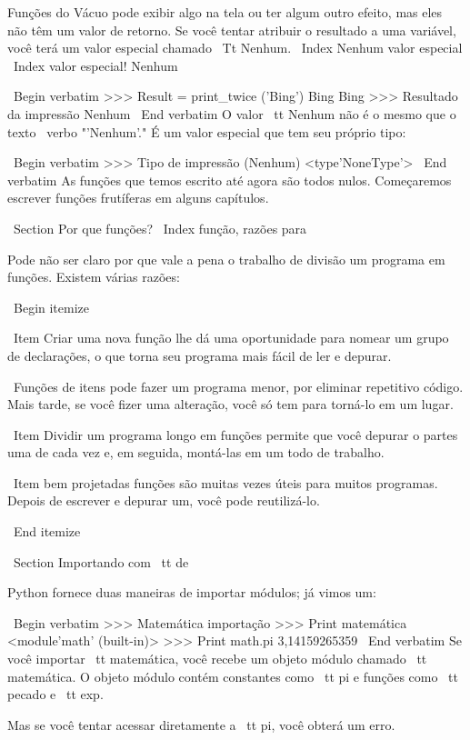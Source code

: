 \documentclass[10pt]{book}
\begin{document}
{Funções do Vácuo pode exibir algo na tela ou ter algum
outro efeito, mas eles não têm um valor de retorno. Se você tentar
atribuir o resultado a uma variável, você terá um valor especial chamado
{\ Tt Nenhum}.
\ Index {Nenhum valor especial}
\ Index {valor especial! Nenhum}

\ Begin {verbatim}
>>> Result = print_twice ('Bing')
Bing
Bing
>>> Resultado da impressão
Nenhum
\ End {verbatim}
%
O valor {\ tt Nenhum} não é o mesmo que o texto \ verbo "'Nenhum'." 
É um valor especial que tem seu próprio tipo:

\ Begin {verbatim}
>>> Tipo de impressão (Nenhum)
<type'NoneType'>
\ End {verbatim}
%
As funções que temos escrito até agora são todos nulos. Começaremos
escrever funções frutíferas em alguns capítulos.


\ Section {Por que funções?}
\ Index {função, razões para}

Pode não ser claro por que vale a pena o trabalho de divisão
um programa em funções. Existem várias razões:

\ Begin {itemize}

\ Item Criar uma nova função lhe dá uma oportunidade para nomear um grupo
de declarações, o que torna seu programa mais fácil de ler e depurar.

\ Funções de itens pode fazer um programa menor, por eliminar repetitivo
código. Mais tarde, se você fizer uma alteração, você só tem
para torná-lo em um lugar.

\ Item Dividir um programa longo em funções permite que você depurar o
partes uma de cada vez e, em seguida, montá-las em um todo de trabalho.

\ Item bem projetadas funções são muitas vezes úteis para muitos programas.
Depois de escrever e depurar um, você pode reutilizá-lo.

\ End {itemize}


\ Section {Importando com {\ tt de}}

Python fornece duas maneiras de importar módulos; já vimos um:

\ Begin {verbatim}
>>> Matemática importação
>>> Print matemática
<module'math' (built-in)>
>>> Print math.pi
3,14159265359
\ End {verbatim}
%
Se você importar {\ tt matemática}, você recebe um objeto módulo chamado {\ tt matemática}.
O objeto módulo contém constantes como {\ tt pi} e funções
como {\ tt pecado} e {\ tt exp}.

Mas se você tentar acessar diretamente a {\ tt pi}, você obterá um erro.

}
\end{document}
